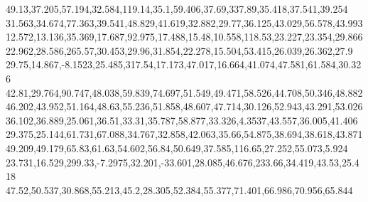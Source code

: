 49.13,37.205,57.194,32.584,119.14,35.1,59.406,37.69,337.89,35.418,37.541,39.254
31.563,34.674,77.363,39.541,48.829,41.619,32.882,29.77,36.125,43.029,56.578,43.993
12.572,13.136,35.369,17.687,92.975,17.488,15.48,10.558,118.53,23.227,23.354,29.866
22.962,28.586,265.57,30.453,29.96,31.854,22.278,15.504,53.415,26.039,26.362,27.9
29.75,14.867,-8.1523,25.485,317.54,17.173,47.017,16.664,41.074,47.581,61.584,30.326
42.81,29.764,90.747,48.038,59.839,74.697,51.549,49.471,58.526,44.708,50.346,48.882
46.202,43.952,51.164,48.63,55.236,51.858,48.607,47.714,30.126,52.943,43.291,53.026
36.102,36.889,25.061,36.51,33.31,35.787,58.877,33.326,4.3537,43.557,36.005,41.406
29.375,25.144,61.731,67.088,34.767,32.858,42.063,35.66,54.875,38.694,38.618,43.871
49.209,49.179,65.83,61.63,54.602,56.84,50.649,37.585,116.65,27.252,55.073,5.924
23.731,16.529,299.33,-7.2975,32.201,-33.601,28.085,46.676,233.66,34.419,43.53,25.418
47.52,50.537,30.868,55.213,45.2,28.305,52.384,55.377,71.401,66.986,70.956,65.844
